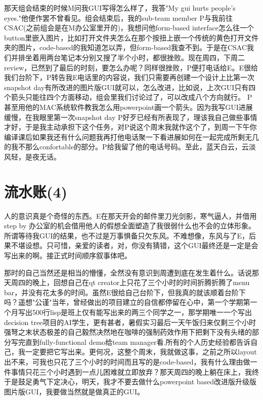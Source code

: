 \documentclass[12pt]{book}
\begin{document}
那天组会结束的时候M问我GUI写得怎么样了，我答"My gui hurts people's eyes."他便作罢不曾看见。组会结束后，我的sub-team member P与我前往CSAC(之前组会是在M办公室里开的)，我想问他form-based interface怎么往一个button里嵌入图片，比如打开文件夹怎么在那个按扭上嵌一个传统的黄色打开文件夹的图片，code-based的我知道怎以弄，但form-based我查不到。于是在CSAC我们并排坐着用两台笔记本分别又搜了半个小时，都很挫败。现在周四，下周二review，已然到了最后的时刻，要怎么办呢？同样很挫败，P便打电话给E。E很给我们台阶下，P转告我E电话里的内容说，我们只需要再创建一个设计上比第一次snapshot day有所改进的图片版GUI就可以，怎么改进，比如说，上次GUI只有四个箭头只能往四个方面移动，组会里我们讨论过了，可以改成八个方向就行。 P甚至用他的MAC系统软件教我怎么用powerpoint画一个箭头。因为我写GUI进展缓慢，在我眼里第一次snapshot day P好歹已经有所表现了，理该我自己做些事情才好，于是我主动承担下这个任务，对P说这个周末我就作这个了，到周一下午你编译课后如果我还有什么问题我再打他电话聚一下看进展如何在一起完成所剩无几的我不那么confortable的部分。P给我留了他的电话号码。至此，蓝天白云，云淡风轻，是夜无话。

\section{流水账(4)}
\label{sec-24-4}
人的意识真是个奇怪的东西。E在那天开会的邮件里刀光剑影，寒气逼人，并借用step by 办公室的机会借用他人的假想全面塑造了我很弱什么也不会的立体形象。所谓等待我GUI的结果，也不过是万事惧备只欠东风。不难想像，东风与了E，后果不堪设想。只可惜，亲爱的读者，对，你没有猜错，这个GUI最终还是一定是会写出来的啊。接正式时间顺序叙事体吧。

那时的自己当然还是相当的懵懂，全然没有意识到周遭到底在发生着什么。话说那天周四的晚上，回想自己在qt creator上只花了三个小时的时间折腾折腾了menu bar，并没有花太多的时间。虽然E很给自己台阶下，但我真的就该顺着台阶下吗？遥想"公谨"当年，曾经做出的项目建立的自信都停留在心中，第一个学期第一个月写出500行lisp是班上仅有能写出来的两三个同学之一，那学期唯一一个写出decision tree项目的AI学生，更有甚者，暑假实习最后一天午饭归来仅剩三个小时强弩之末状态极差的自己毅然决然地在咖啡的强制药效作用下把剩下没有头绪的部分写完直到fully-functional demo给team manager看.所有的个人历史经验都告诉自己，我一定要把它写出来。更何况，这整个周末，我就做这事，之前之所以layout出不来，可我也只花了三个小时的时间而且写的是code-based，我有什么理由做一件事情只花三个小时遇到一点儿困难就立即放弃？那天周四的晚上躺在床上，我终于是鼓足勇气下定决心，明天，我才不要去做什么powerpoint based改进版升级版图片版GUI，我要做当然就是做真正的GUI。
\end{document}
